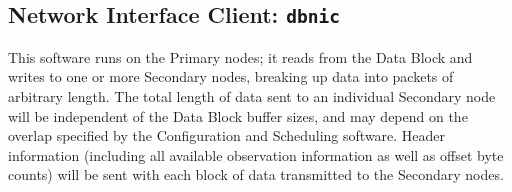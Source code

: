 \subsection{Network Interface Client: {\tt dbnic}}

This software runs on the Primary nodes; it reads from the Data Block
and writes to one or more Secondary nodes, breaking up data into
packets of arbitrary length.  The total length of data sent to an
individual Secondary node will be independent of the Data Block buffer
sizes, and may depend on the overlap specified by the Configuration
and Scheduling software.  Header information (including all available
observation information as well as offset byte counts) will be sent
with each block of data transmitted to the Secondary nodes.
